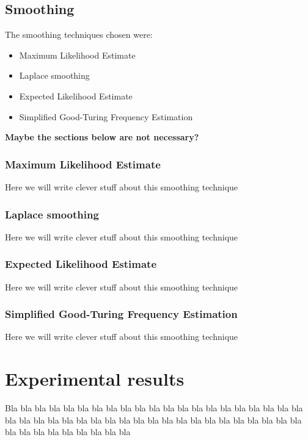\documentclass[a4paper,12pt]{article}
\begin{document}
\subsection{Smoothing}
The smoothing techniques chosen were:
\begin{itemize}
\item Maximum Likelihood Estimate
\item Laplace smoothing
\item Expected Likelihood Estimate
\item Simplified Good-Turing Frequency Estimation
\end{itemize}

\textbf{Maybe the sections below are not necessary?}

\subsubsection{Maximum Likelihood Estimate}
Here we will write clever stuff about this smoothing technique

\subsubsection{Laplace smoothing}
Here we will write clever stuff about this smoothing technique

\subsubsection{Expected Likelihood Estimate}
Here we will write clever stuff about this smoothing technique

\subsubsection{Simplified Good-Turing Frequency Estimation}
Here we will write clever stuff about this smoothing technique








\section{Experimental results}
\label{sec:exps}

Bla bla bla bla bla bla bla bla bla bla bla bla bla bla bla bla bla
bla bla bla bla bla bla bla bla bla bla bla bla bla bla bla bla bla
bla bla bla bla bla bla bla bla bla bla bla bla bla bla bla bla bla
\end{document}
